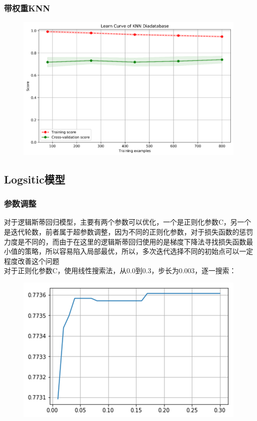 \documentclass[12pt]{article}
\begin{document}
\subsubsection{带权重KNN}
\begin{figure}[H]
	\centering
	\includegraphics[width=0.7\linewidth]{figures/screenshot015}
	\caption{}
\end{figure}


\newpage
\subsection{Logsitic模型}






\subsubsection{参数调整}
\begin{flushleft}
	\noindent\qquad 对于逻辑斯蒂回归模型，主要有两个参数可以优化，一个是正则化参数C，另一个是迭代轮数，前者属于超参数调整，因为不同的正则化参数，对于损失函数的惩罚力度是不同的，而由于在这里的逻辑斯蒂回归使用的是梯度下降法寻找损失函数最小值的策略，所以容易陷入局部最优，所以，多次迭代选择不同的初始点可以一定程度改善这个问题\\
	\noindent\qquad 对于正则化参数C，使用线性搜索法，从0.0到0.3，步长为0.003，逐一搜索：
	
\end{flushleft}
\begin{figure}[H]
	\centering
	\includegraphics[width=0.7\linewidth]{figures/screenshot016}
	\caption{}
\end{figure}
\end{document}
